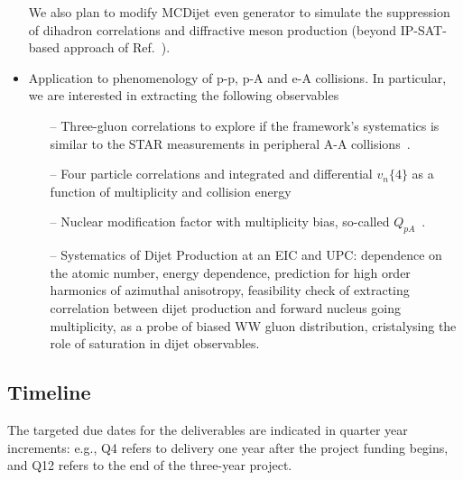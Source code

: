 \begin{itemize}
				We also plan to modify MCDijet even generator to simulate the 
				suppression of dihadron correlations and diffractive meson production (beyond IP-SAT-based approach of Ref.~\cite{Toll:2012mb}). 	

			\item Application to phenomenology of p-p, p-A and e-A collisions. 
				In particular, we are interested in extracting the following observables 
				\begin{itemize}
					\item[--] Three-gluon correlations to explore if 
						the framework's systematics is similar to the STAR measurements
						in peripheral A-A collisions~\cite{Adamczyk:2017hdl,Adamczyk:2017byf}.  	
					\item[--] Four particle correlations and integrated and differential $v_n\{4\}$ as a function of  multiplicity and collision energy
					\item[--] Nuclear modification factor with multiplicity bias, so-called $Q_{pA}$~\cite{Adam:2014qja}.  
					\item[--] 
					Systematics of Dijet Production at an EIC and UPC: 
					dependence on the atomic number, energy dependence, 
					prediction for high order harmonics of azimuthal anisotropy, 
					feasibility check of extracting correlation between dijet production and forward nucleus going  multiplicity, as a probe of biased WW gluon distribution, cristalysing the role of saturation in dijet observables.  
				\end{itemize}
		\end{itemize} 
		
		
		




    \vspace{0.5em}
    \subsection{Timeline}
        \label{sec:p12}
The targeted due dates for the deliverables are indicated in quarter year
increments: e.g., Q4 refers to delivery one year after the project funding
begins, and Q12 refers to the end of the three-year project.

